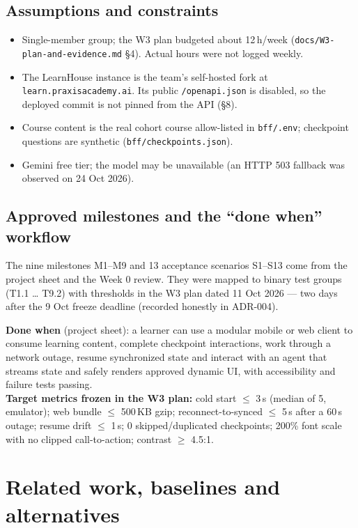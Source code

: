 \documentclass[11pt,a4paper]{article}
\newcommand{\fp}[1]{\nolinkurl{#1}}
\begin{document}
\subsection{Assumptions and constraints}
\begin{itemize}
  \item Single-member group; the W3 plan budgeted about 12\,h/week (\fp{docs/W3-plan-and-evidence.md} §4). Actual hours were not logged weekly.
  \item The LearnHouse instance is the team's self-hosted fork at \texttt{learn.praxisacademy.ai}. Its public \texttt{/openapi.json} is disabled, so the deployed commit is not pinned from the API (§8).
  \item Course content is the real cohort course allow-listed in \fp{bff/.env}; checkpoint questions are synthetic (\fp{bff/checkpoints.json}).
  \item Gemini free tier; the model may be unavailable (an HTTP 503 fallback was observed on 24 Oct 2026).
\end{itemize}

\subsection{Approved milestones and the ``done when'' workflow}
The nine milestones M1–M9 and 13 acceptance scenarios S1–S13 come from the project sheet and the Week 0
review. They were mapped to binary test groups (T1.1 … T9.2) with thresholds in the W3 plan dated
11 Oct 2026 — two days after the 9 Oct freeze deadline (recorded honestly in ADR-004).
\begin{tcolorbox}[notebox]
\small\textbf{Done when} (project sheet): a learner can use a modular mobile or web client to consume
learning content, complete checkpoint interactions, work through a network outage, resume synchronized
state and interact with an agent that streams state and safely renders approved dynamic UI, with
accessibility and failure tests passing.\\[3pt]
\textbf{Target metrics frozen in the W3 plan:} cold start $\le$ 3\,s (median of 5, emulator); web bundle
$\le$ 500\,KB gzip; reconnect-to-synced $\le$ 5\,s after a 60\,s outage; resume drift $\le$ 1\,s; 0
skipped/duplicated checkpoints; 200\% font scale with no clipped call-to-action; contrast $\ge$ 4.5:1.
\end{tcolorbox}

\section{Related work, baselines and alternatives}
\end{document}

